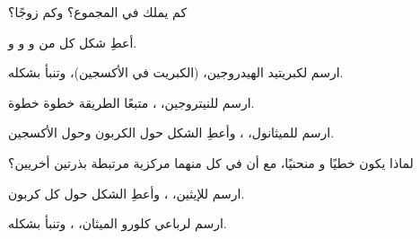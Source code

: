 \begin{exercise}[$\star$]\label{exo:g10:lewis-and-shape:4}
كم  يملك   في المجموع؟ وكم
زوجًا؟
\end{exercise}

\begin{exercise}[$\star$]\label{exo:g10:lewis-and-shape:5}
أعطِ شكل كل من  و و و.
\end{exercise}

\begin{exercise}[$\star\star$]\label{exo:g10:lewis-and-shape:6}
ارسم  لكبريتيد الهيدروجين،  (الكبريت في  الأكسجين)،
وتنبأ بشكله.
\end{exercise}

\begin{exercise}[$\star\star$]\label{exo:g10:lewis-and-shape:7}
ارسم  للنيتروجين، ، متبعًا الطريقة خطوة
خطوة.
\end{exercise}

\begin{exercise}[$\star\star$]\label{exo:g10:lewis-and-shape:8}
ارسم  للميثانول، ، وأعطِ الشكل حول الكربون وحول
الأكسجين.
\end{exercise}

\begin{exercise}[$\star\star$]\label{exo:g10:lewis-and-shape:9}
لماذا يكون  خطيًا و منحنيًا، مع أن في كل منهما  مركزية
مرتبطة بذرتين أخريين؟
\end{exercise}

\begin{exercise}[$\star\star$]\label{exo:g10:lewis-and-shape:10}
ارسم  للإيثين، ، وأعطِ الشكل حول كل 
كربون.
\end{exercise}

\begin{exercise}[$\star\star$]\label{exo:g10:lewis-and-shape:11}
ارسم  لرباعي كلورو الميثان، ، وتنبأ
بشكله.
\end{exercise}

